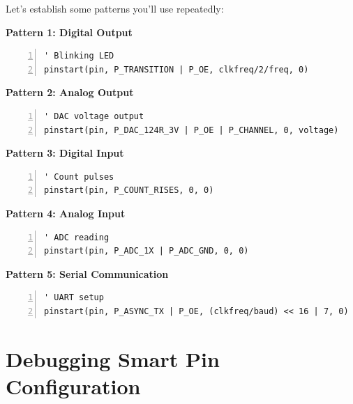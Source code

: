 \documentclass[11pt,a4paper,oneside,english]{book}
\begin{document}
Let's establish some patterns you'll use repeatedly:

\textbf{Pattern 1: Digital Output}

\begin{Spin2Block}
\begin{Verbatim}[numbers=left,numbersep=5pt,xleftmargin=15pt]
' Blinking LED
pinstart(pin, P_TRANSITION | P_OE, clkfreq/2/freq, 0)
\end{Verbatim}
\end{Spin2Block}

\textbf{Pattern 2: Analog Output}

\begin{Spin2Block}
\begin{Verbatim}[numbers=left,numbersep=5pt,xleftmargin=15pt]
' DAC voltage output
pinstart(pin, P_DAC_124R_3V | P_OE | P_CHANNEL, 0, voltage)
\end{Verbatim}
\end{Spin2Block}

\textbf{Pattern 3: Digital Input}

\begin{Spin2Block}
\begin{Verbatim}[numbers=left,numbersep=5pt,xleftmargin=15pt]
' Count pulses
pinstart(pin, P_COUNT_RISES, 0, 0)
\end{Verbatim}
\end{Spin2Block}

\textbf{Pattern 4: Analog Input}

\begin{Spin2Block}
\begin{Verbatim}[numbers=left,numbersep=5pt,xleftmargin=15pt]
' ADC reading
pinstart(pin, P_ADC_1X | P_ADC_GND, 0, 0)
\end{Verbatim}
\end{Spin2Block}

\textbf{Pattern 5: Serial Communication}

\begin{Spin2Block}
\begin{Verbatim}[numbers=left,numbersep=5pt,xleftmargin=15pt]
' UART setup
pinstart(pin, P_ASYNC_TX | P_OE, (clkfreq/baud) << 16 | 7, 0)
\end{Verbatim}
\end{Spin2Block}

\hypertarget{debugging-smart-pin-configuration}{%
\section{Debugging Smart Pin
Configuration}\label{debugging-smart-pin-configuration}}
\end{document}
